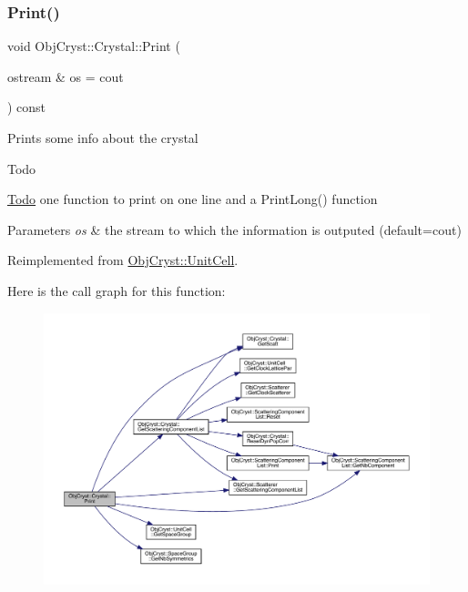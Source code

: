\subsubsection{\texorpdfstring{Print()}{Print()}}
{\footnotesize\ttfamily void Obj\+Cryst\+::\+Crystal\+::\+Print (\begin{DoxyParamCaption}\item[{ostream \&}]{os = {\ttfamily cout} }\end{DoxyParamCaption}) const\hspace{0.3cm}{\ttfamily [virtual]}}

Prints some info about the crystal \begin{DoxyRefDesc}{Todo}
\item[\mbox{\hyperlink{todo__todo000002}{Todo}}]one function to print on one line and a Print\+Long() function \end{DoxyRefDesc}

\begin{DoxyParams}{Parameters}
{\em os} & the stream to which the information is outputed (default=cout) \\
\hline
\end{DoxyParams}


Reimplemented from \mbox{\hyperlink{class_obj_cryst_1_1_unit_cell_a19ef2e012dfd628935a22b40a9c85957}{Obj\+Cryst\+::\+Unit\+Cell}}.

Here is the call graph for this function\+:
\nopagebreak
\begin{figure}[H]
\begin{center}
\leavevmode
\includegraphics[width=350pt]{class_obj_cryst_1_1_crystal_a086f39272ca94c23ff7819151a9edf37_cgraph}
\end{center}
\end{figure}
\mbox{\label{class_obj_cryst_1_1_crystal_a483003d7cfbd4bc0027615f1bc2e9f39}} 
